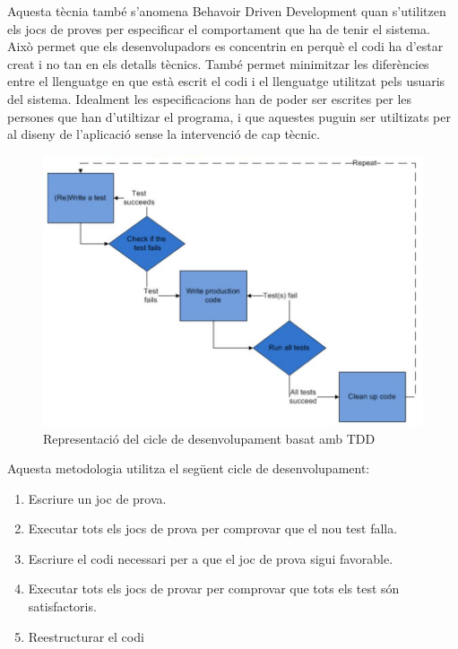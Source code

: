 Aquesta tècnia també s'anomena Behavoir Driven Development quan s'utilitzen els jocs de proves per especificar el comportament que ha de tenir el sistema. Això permet que els desenvolupadors es concentrin en perquè el codi ha d'estar creat i no tan en els detalls tècnics. També permet minimitzar les diferències entre el llenguatge en que està escrit el codi i el llenguatge utilitzat pels usuaris del sistema. Idealment les especificacions han de poder ser escrites per les persones que han d'utiltizar el programa, i que aquestes puguin ser utiltizats per al diseny de l'aplicació sense la intervenció de cap tècnic.


\begin{figure}[htbp]
\centering\includegraphics[width=12cm]{img/ttd1.jpg}
\caption{Representació del cicle de desenvolupament basat amb TDD}
\label{fig:tdd}
\end{figure} 

\newpage

Aquesta metodologia utilitza el següent cicle de desenvolupament: 

\begin{enumerate}
    \item{Escriure un joc de prova.}
    \item{Executar tots els jocs de prova per comprovar que el nou test falla.}
    \item{Escriure el codi necessari per a que el joc de prova sigui favorable.}
    \item{Executar tots els jocs de provar per comprovar que tots els test són satisfactoris.}
    \item{Reestructurar el codi}
\end{enumerate}

